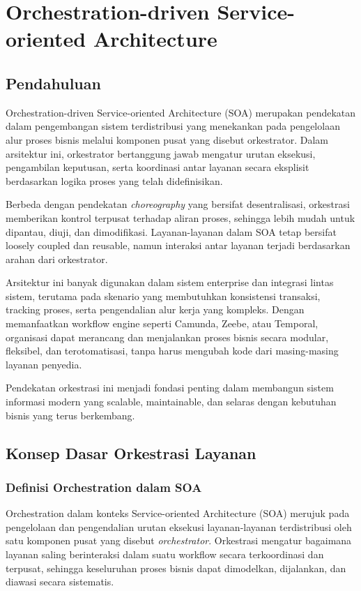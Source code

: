 \chapter{Orchestration-driven Service-oriented Architecture}

\section{Pendahuluan}

Orchestration-driven Service-oriented Architecture (SOA) merupakan pendekatan dalam pengembangan sistem terdistribusi yang menekankan pada pengelolaan alur proses bisnis melalui komponen pusat yang disebut orkestrator. Dalam arsitektur ini, orkestrator bertanggung jawab mengatur urutan eksekusi, pengambilan keputusan, serta koordinasi antar layanan secara eksplisit berdasarkan logika proses yang telah didefinisikan.

Berbeda dengan pendekatan \textit{choreography} yang bersifat desentralisasi, orkestrasi memberikan kontrol terpusat terhadap aliran proses, sehingga lebih mudah untuk dipantau, diuji, dan dimodifikasi. Layanan-layanan dalam SOA tetap bersifat loosely coupled dan reusable, namun interaksi antar layanan terjadi berdasarkan arahan dari orkestrator.

Arsitektur ini banyak digunakan dalam sistem enterprise dan integrasi lintas sistem, terutama pada skenario yang membutuhkan konsistensi transaksi, tracking proses, serta pengendalian alur kerja yang kompleks. Dengan memanfaatkan workflow engine seperti Camunda, Zeebe, atau Temporal, organisasi dapat merancang dan menjalankan proses bisnis secara modular, fleksibel, dan terotomatisasi, tanpa harus mengubah kode dari masing-masing layanan penyedia.

Pendekatan orkestrasi ini menjadi fondasi penting dalam membangun sistem informasi modern yang scalable, maintainable, dan selaras dengan kebutuhan bisnis yang terus berkembang.


\section{Konsep Dasar Orkestrasi Layanan}

\subsection{Definisi Orchestration dalam SOA}

Orchestration dalam konteks Service-oriented Architecture (SOA) merujuk pada pengelolaan dan pengendalian urutan eksekusi layanan-layanan terdistribusi oleh satu komponen pusat yang disebut \textit{orchestrator}. Orkestrasi mengatur bagaimana layanan saling berinteraksi dalam suatu workflow secara terkoordinasi dan terpusat, sehingga keseluruhan proses bisnis dapat dimodelkan, dijalankan, dan diawasi secara sistematis.

